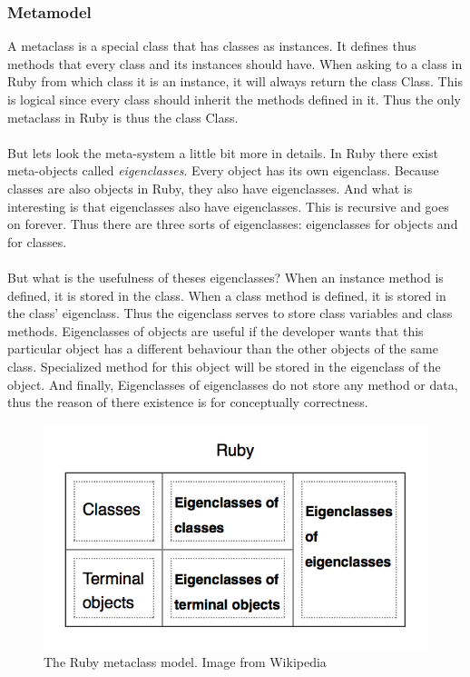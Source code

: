 \documentclass[12pt,a4paper,twocolumn]{article}
\begin{document}
\subsubsection{Metamodel}
\label{sec:metaclass}
A metaclass \cite{wiki:metaclass, rubyMetaclass} is a special class that has classes as instances. It defines thus methods that every class and its instances should have. When asking to a class in Ruby from which class it is an instance, it will always return the class Class. This is logical since every class should inherit the methods defined in it. Thus the only metaclass in Ruby is thus the class Class.
\\
\\
But lets look the meta-system a little bit more in details. In Ruby there exist meta-objects called \emph{eigenclasses}. Every object has its own eigenclass. Because classes are also objects in Ruby, they also have eigenclasses. And what is interesting is that eigenclasses also have eigenclasses. This is recursive and goes on forever. Thus there are three sorts of eigenclasses: eigenclasses for objects and for classes. 
\\
\\
But what is the usefulness of theses eigenclasses? When an instance method is defined, it is stored in the class. When a class method is defined, it is stored in the class' eigenclass. Thus the eigenclass serves to store class variables and class methods. Eigenclasses of objects are useful if the developer wants that this particular object has a different behaviour than the other objects of the same class. Specialized method for this object will be stored in the eigenclass of the object. And finally, Eigenclasses of eigenclasses do not store any method or data, thus the reason of there existence is for conceptually correctness. 
\begin{figure}[H]
\centering
\includegraphics[scale=0.5]{Ruby.png}
\caption{The Ruby metaclass model. Image from Wikipedia \cite{wiki:metaclass}}
\label{fig:metaclass}
\end{figure}
\end{document}
